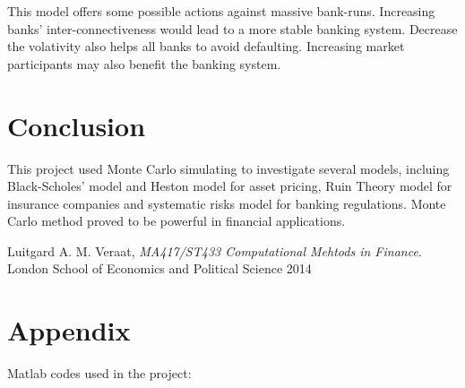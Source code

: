 \documentclass[a4paper, draft, 11pt]{article}
\newcommand{\includecode}[1]{}
\begin{document}
This model offers some possible actions against massive bank-runs. Increasing banks' inter-connectiveness would lead to a more stable banking system. Decrease the volativity also helps all banks to avoid defaulting. Increasing market participants may also benefit the banking system.


\section{Conclusion}
This project used Monte Carlo simulating to investigate several models, incluing Black-Scholes' model and Heston model for asset pricing, Ruin Theory model for insurance companies and systematic risks model for banking regulations. Monte Carlo method proved to be powerful in financial applications.
\newpage
\begin{thebibliography}{9}
	  Luitgard A. M. Veraat,
		\emph{MA417/ST433 Computational Mehtods in Finance}.
		London School of Economics and Political Science
		2014
\end{thebibliography}

\section{Appendix}
Matlab codes used in the project:
\includecode{Q1.m}
\includecode{GeometricBrownianMotion.m}
\includecode{CallValue.m}
\includecode{CallPricingByMonteCarlo.m}
\includecode{Q2.m}
\includecode{getHestonSimulation.m}
\includecode{HestonCallPricingByMonteCarlo.m}
\includecode{getImpliedVolatility.m}
\includecode{DownAndOutOptionValue.m}
\includecode{DownAndOutOptionPricingByMonteCarlo.m}
\includecode{DownAndOutOptionPricingBySolvingPDE.m}
\includecode{Q3.m}
\includecode{CompoundPoissonGenerator.m}
\includecode{getU.m}
\includecode{ruinProbSimulation.m}
\includecode{ruinProbSimulationWithSigma.m}
\includecode{getTau.m}
\includecode{getNewU.m}
\includecode{isRuined.m}
\includecode{notRuined.m}
\includecode{RuinProbOutput.m}
\includecode{Q4.m}
\includecode{SystemRiskModel.m}
\includecode{getDefaultTime.m}
\includecode{getNumofDefault.m}
\includecode{DefaultReport.m}
\includecode{saveTightFigure.m}
\end{document}
